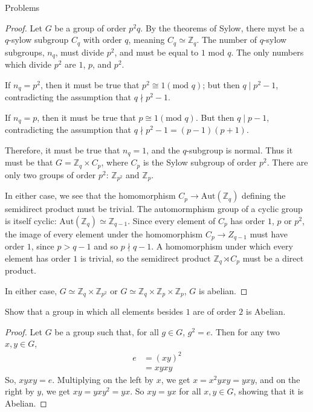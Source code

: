 \documentclass[12pt]{article}
\newcommand{\Z}{\mathbb{Z}}
\theoremstyle{definition}
\newenvironment{problem}[2][Problem]{\begin{trivlist}
\item[\hskip \labelsep {\bfseries #1}\hskip \labelsep {\bfseries #2.}]}{\end{trivlist}}
\begin{document}
\begin{section}{Problems}
\begin{problem}{13}
	\begin{proof}
		Let $G$ be a group of order $p^2q$. By the theorems of Sylow, there myst be a $q$-sylow subgroup $C_q$ with order $q$, meaning $C_q \simeq \Z_q$. The number of $q$-sylow subgroups, $n_q$, must divide $p^2$, and must be equal to $1$ mod $q$. The only numbers which divide $p^2$ are $1$, $p$, and $p^2$.
		\par If $n_q = p^2$, then it must be true that $p^2 \cong 1 (\text{mod }q)$; but then $q \mid p^2 - 1$, contradicting the assumption that $q \nmid p^2 - 1$.
		\par If $n_q = p$, then it must be true that $p \cong 1 (\text{mod }q)$. But then $q \mid p - 1$, contradicting the assumption that $q \nmid p^2 - 1 = (p-1)(p+1)$. 
		\par Therefore, it must be true that $n_q = 1$, and the $q$-subgroup is normal. Thus it must be that $G = \Z_q \times C_p$, where $C_p$ is the Sylow subgroup of order $p^2$. There are only two groups of order $p^2$: $\Z_{p^2}$ and $\Z_p$. 
		\par In either case, we see that the homomorphism $C_p \to \text{Aut}(\Z_q)$ defining the semidirect product must be trivial. The automormphism group of a cyclic group is itself cyclic: $\text{Aut}(\Z_q) \simeq \Z_{q-1}$. Since every element of $C_p$ has order $1$, $p$ or $p^{2}$, the image of every element under the homomorphism $C_p \to Z_{q-1}$ must have order $1$, since $p > q-1$ and so $p \nmid q-1$. A homomorphism under which every element has order $1$ is trivial, so the semidirect product $\Z_q \rtimes C_p$ must be a direct product.
		\par In either case, $G \simeq \Z_q \times \Z_{p^2}$ or $G \simeq \Z_q \times \Z_p \times \Z_p$, $G$ is abelian.
	\end{proof}
\end{problem}
\begin{problem}{14}
	Show that a group in which all elements besides $1$ are of order $2$ is Abelian.
	\begin{proof}
		Let $G$ be a group such that, for all $g \in G$, $g^{2} = e$. Then for any two $x, y \in G$,
		\begin{align*}
			e &= (xy)^2\\
			&= xyxy
		\end{align*}
		So,  $xyxy = e$. Multiplying on the left by $x$, we get $x = x^2yxy = yxy$, and on the right by $y$, we get $xy = yxy^2 = yx$. So $xy = yx$ for all $x, y \in G$, showing that it is Abelian.
	\end{proof}

\end{problem}
\end{section}
\end{document}
